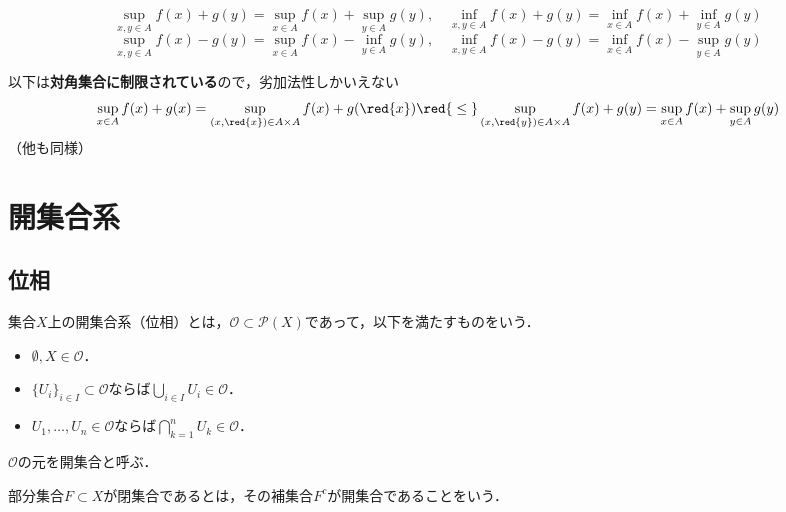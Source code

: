 \begin{proposition}
    \[ \sup_{x,y \in A} f(x) + g(y) = \sup_{x \in A} f(x) + \sup_{y \in A} g(y), \quad \inf_{x,y \in A} f(x) + g(y) = \inf_{x \in A} f(x) + \inf_{y \in A} g(y) \]
    \[ \sup_{x,y \in A} f(x) - g(y) = \sup_{x \in A} f(x) - \inf_{y \in A} g(y), \quad \inf_{x,y \in A} f(x) - g(y) = \inf_{x \in A} f(x) - \sup_{y \in A} g(y) \]
\end{proposition}

\begin{remark}
    以下は\textbf{対角集合に制限されている}ので，劣加法性しかいえない
    \[ \sup_{x \in A} f(x) + g(x) = \sup_{(x,\red{x}) \in A \times A} f(x) + g(\red{x}) \red{\;\le\;} \sup_{(x,\red{y}) \in A \times A} f(x) + g(y) = \sup_{x \in A} f(x) + \sup_{y \in A} g(y)\]
    （他も同様）
\end{remark}

\section{開集合系}

\subsection{位相}

\begin{definition}
    集合$X$上の開集合系（位相）とは，$\mathcal O \subset \mathcal P(X)$であって，以下を満たすものをいう．
    \begin{itemize}
        \item $\emptyset, X \in \mathcal O$．
        \item $\{U_i\}_{i \in I} \subset \mathcal O$ならば$\bigcup_{i \in I} U_i \in \mathcal O$．
        \item $U_1,\dots,U_n \in \mathcal O$ならば$\bigcap_{k=1}^n U_k \in \mathcal O$．
    \end{itemize}
    $\mathcal O$の元を開集合と呼ぶ．
\end{definition}

\begin{definition}
    部分集合$F \subset X$が閉集合であるとは，その補集合$F^c$が開集合であることをいう．
\end{definition}

